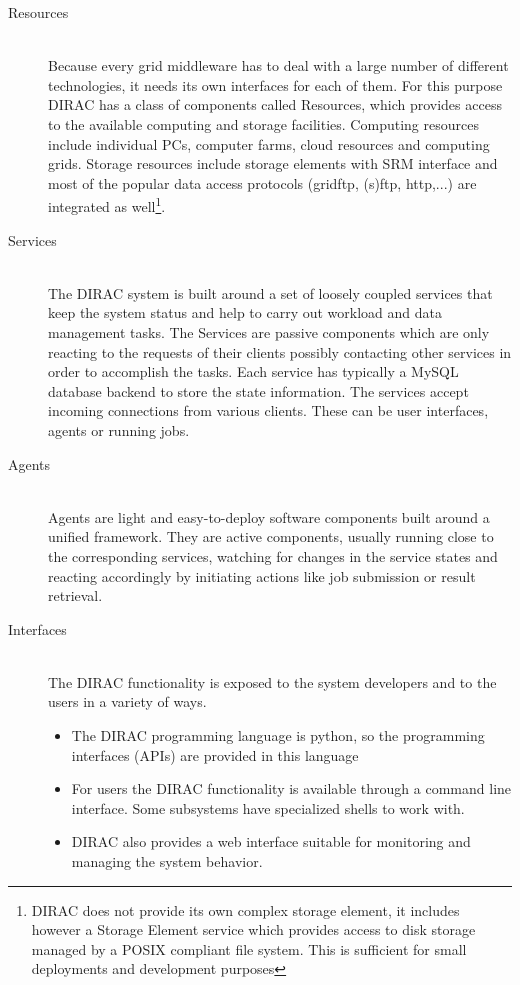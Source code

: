 \begin{description}

\item[Resources] \hfill \\
Because every grid middleware has to deal with a large number of different technologies, it needs its own 
interfaces for each of them. For this purpose DIRAC has a class of components called Resources,
which provides access to the available computing and storage facilities. 
Computing resources include individual PCs, computer farms, cloud resources and computing grids. Storage 
resources include storage elements with SRM interface \cite{SRM} and most of the popular data access 
protocols (gridftp, (s)ftp, http,...) are integrated as well\footnote{DIRAC does not provide its own complex 
storage element, it includes however a Storage Element service which provides access to disk 
storage managed by a POSIX compliant file system. This is sufficient for small deployments and development
purposes}.

\pagebreak

\item[Services] \hfill \\
The DIRAC system is built around a set of loosely coupled services that keep the system status and
help to carry out workload and data management tasks. The Services are passive components which
are only reacting to the requests of their clients possibly contacting other services in order to
accomplish the tasks. Each service has typically a MySQL \cite{MySQL} database backend to store the state
information. The services accept incoming connections from various clients. These can be user interfaces,
agents or running jobs. 

\item[Agents] \hfill \\
Agents are light and easy-to-deploy software components built around a unified framework. They are active
components, usually running close to the corresponding services, watching for changes in the service states and 
reacting accordingly by initiating actions like job submission or result retrieval. 

\item[Interfaces] \hfill \\
The DIRAC functionality is exposed to the system developers and to the users in a variety of ways. 
	\begin{itemize}
		\item The DIRAC programming language is python, so the programming interfaces (APIs) are provided in this 
			language
		\item For users the DIRAC functionality is available through a command line interface. Some subsystems 		
			have specialized shells to work with.
		\item DIRAC also provides a web interface suitable for monitoring and managing the system behavior.
	\end{itemize}

\end{description}

